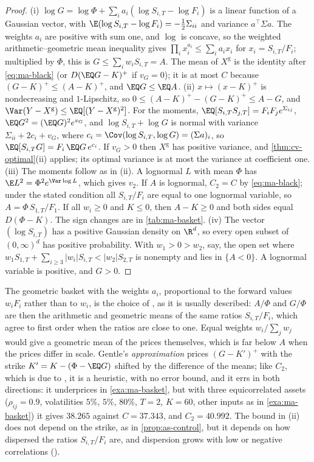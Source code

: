 \begin{proof}
(i) $\log G=\log\Phi+\sum_ia_i(\log S_{i,T}-\log F_i)$ is a linear function of a Gaussian vector,
with $\E(\log S_{i,T}-\log F_i)=-\frac12\Sigma_{ii}$ and variance $a^\top\Sigma a$. The weights $a_i$ are
positive with sum one, and $\log$ is concave, so the weighted arithmetic--geometric mean
inequality gives $\prod_ix_i^{a_i}\le\sum_ia_ix_i$ for $x_i=S_{i,T}/F_i$; multiplied by $\Phi$, this
is $G\le\sum_iw_iS_{i,T}=A$. The mean of $X^{\mathrm g}$ is the identity after \eqref{eq:ma-black}
(or $D(\EQ G-K)^+$ if $v_G=0$); it is at most $C$ because $(G-K)^+\le(A-K)^+$, and
$\EQ G\le\EQ A$.
(ii) $x\mapsto(x-K)^+$ is nondecreasing and $1$-Lipschitz, so $0\le(A-K)^+-(G-K)^+\le A-G$, and
$\Var(Y-X^{\mathrm g})\le\EQ[(Y-X^{\mathrm g})^2]$. For the moments, $\EQ[S_{i,T}S_{j,T}]=F_iF_je^{\Sigma_{ij}}$,
$\EQ G^2=(\EQ G)^2e^{v_G}$, and $\log S_{i,T}+\log G$ is normal with variance
$\Sigma_{ii}+2c_i+v_G$, where $c_i=\Cov(\log S_{i,T},\log G)=(\Sigma a)_i$, so
$\EQ[S_{i,T}G]=F_i\,\EQ G\,e^{c_i}$. If $v_G>0$ then $X^{\mathrm g}$ has positive variance, and
\cref{thm:cv-optimal}(ii) applies; its optimal variance is at most the variance at coefficient one.
(iii) The moments follow as in (ii). A lognormal $L$ with mean $\Phi$ has $\E L^2=\Phi^2e^{\Var\log L}$,
which gives $v_2$. If $A$ is lognormal, $C_2=C$ by \eqref{eq:ma-black}; under the stated
condition all $S_{i,T}/F_i$ are equal to one lognormal variable, so $A=\Phi\,S_{1,T}/F_1$. If all
$w_i\ge0$ and $K\le0$, then $A-K\ge0$ and both sides equal $D(\Phi-K)$. The sign changes are in
\cref{tab:ma-basket}.
(iv) The vector $(\log S_{i,T})$ has a positive Gaussian density on $\R^d$, so every open subset of
$(0,\infty)^d$ has positive probability. With $w_1>0>w_2$, say, the open set where
$w_1S_{1,T}+\sum_{i\ge3}|w_i|S_{i,T}<|w_2|S_{2,T}$ is nonempty and lies in $\{A<0\}$. A lognormal
variable is positive, and $G>0$.
\end{proof}

The geometric basket with the weights $a_i$, proportional to the forward values $w_iF_i$ rather
than to $w_i$, is the choice of \textcite{gentle-basket}, as it is usually described: $A/\Phi$ and $G/\Phi$ are then the
arithmetic and geometric means of the same ratios $S_{i,T}/F_i$, which agree to first order when the
ratios are close to one. Equal weights $w_i/\sum_jw_j$ would give a geometric mean of the prices
themselves, which is far below $A$ when the prices differ in scale. Gentle's \emph{approximation}
prices $(G-K')^+$ with the strike $K'=K-(\Phi-\EQ G)$ shifted by the difference of the means; like
$C_2$, which is due to \textcite{levy-1992}, it is a heuristic, with no error bound, and it errs in both
directions: it underprices in \cref{exa:ma-basket}, but with three equicorrelated assets ($\rho_{ij}=0.9$,
volatilities $5\%$, $5\%$, $80\%$, $T=2$, $K=60$, other inputs as in \cref{exa:ma-basket}) it gives $38.265$
against $C=37.343$, and $C_2=40.992$. The bound in (ii)
does not depend on the strike, as in \cref{prop:as-control}, but it depends on how dispersed the
ratios $S_{i,T}/F_i$ are, and dispersion grows with low or negative correlations
().

